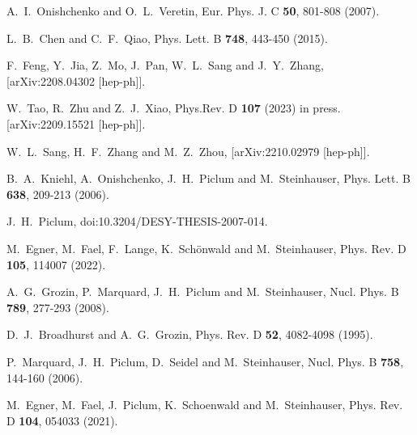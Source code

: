 \documentclass[onecolumn,preprintnumbers,aps,superscriptaddress,nofootinbib,prd,notitlepage]{revtex4-1}
\begin{document}
{\begin{thebibliography}{99}
A.~I.~Onishchenko and O.~L.~Veretin,
Eur. Phys. J. C \textbf{50}, 801-808 (2007).

L.~B.~Chen and C.~F.~Qiao,
Phys. Lett. B \textbf{748}, 443-450 (2015).

F.~Feng, Y.~Jia, Z.~Mo, J.~Pan, W.~L.~Sang and J.~Y.~Zhang,
[arXiv:2208.04302 [hep-ph]].

W.~Tao, R.~Zhu and Z.~J.~Xiao,  Phys.Rev. D {\bf 107} (2023) in press.
[arXiv:2209.15521 [hep-ph]].

W.~L.~Sang, H.~F.~Zhang and M.~Z.~Zhou,
[arXiv:2210.02979 [hep-ph]].

B.~A.~Kniehl, A.~Onishchenko, J.~H.~Piclum and M.~Steinhauser,
Phys. Lett. B \textbf{638}, 209-213 (2006).

J.~H.~Piclum,
doi:10.3204/DESY-THESIS-2007-014.

M.~Egner, M.~Fael, F.~Lange, K.~Sch\"onwald and M.~Steinhauser,
Phys. Rev. D \textbf{105}, 114007 (2022).

A.~G.~Grozin, P.~Marquard, J.~H.~Piclum and M.~Steinhauser,
Nucl. Phys. B \textbf{789}, 277-293 (2008).

D.~J.~Broadhurst and A.~G.~Grozin,
Phys. Rev. D \textbf{52}, 4082-4098 (1995).

P.~Marquard, J.~H.~Piclum, D.~Seidel and M.~Steinhauser,
Nucl. Phys. B \textbf{758}, 144-160 (2006).

M.~Egner, M.~Fael, J.~Piclum, K.~Schoenwald and M.~Steinhauser,
Phys. Rev. D \textbf{104},  054033 (2021).


\end{thebibliography}}
\end{document}
